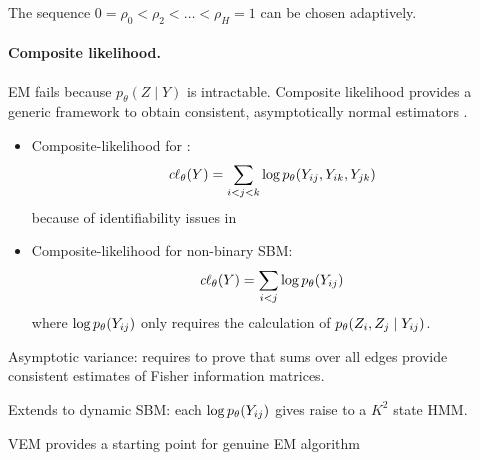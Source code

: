 \ra The sequence $0 = \rho_0 < \rho_2 < \dots < \rho_H = 1$ can be chosen adaptively.


\jump \paragraph{Composite likelihood.} EM fails because $p_\theta(Z \mid Y)$ is intractable. Composite likelihood provides a generic framework to obtain consistent, asymptotically normal estimators \citep{VRF11}.
\begin{itemize}
\item Composite-likelihood for \SBMo \citep{AmM12}:
$$
\text{\it c}\ell_\theta(Y) = \sum_{i < j < k} \log p_\theta({Y_{ij}}, Y_{ik}, Y_{jk})
$$
because of identifiability issues in \SBMo
\item Composite-likelihood for non-binary SBM:
$$
\text{\it c}\ell_\theta(Y) = \sum_{i < j} \log p_\theta({Y_{ij}})
$$
where $\log p_\theta({Y_{ij}})$ only requires the calculation of $p_\theta(Z_i, Z_j \mid {Y_{ij}})$.
\end{itemize}

\ra Asymptotic variance: requires to prove that sums over all edges provide consistent estimates of Fisher information matrices.

\ra Extends to dynamic SBM: each $\log p_\theta({Y_{ij}})$ gives raise to a $K^2$ state HMM.

\ra VEM provides a starting point for genuine EM algorithm

